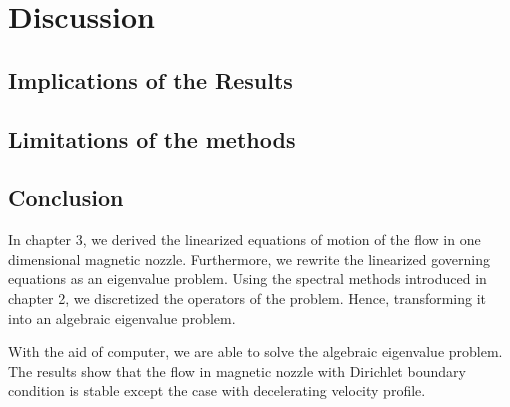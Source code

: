 \chapter{Discussion} \label{chap:discussion}
\section{Implications of the Results}

\section{Limitations of the methods}

\section{Conclusion}
In chapter 3, we derived the linearized equations of motion of the flow in one dimensional magnetic nozzle. Furthermore, we rewrite the linearized governing equations as an eigenvalue problem. Using the spectral methods introduced in chapter 2, we discretized the operators of the problem. Hence, transforming it into an algebraic eigenvalue problem.

With the aid of computer, we are able to solve the algebraic eigenvalue problem. The results show that the flow in magnetic nozzle with Dirichlet boundary condition is stable except the case with decelerating velocity profile.